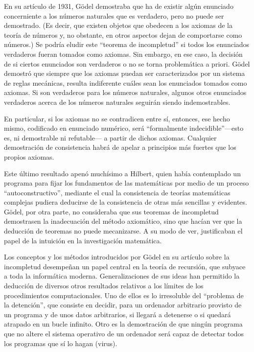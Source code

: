 \documentclass[a4paper, 12pt]{article}
\begin{document}
En su artículo de 1931, Gödel demostraba que ha de existir algún enunciado concerniente a los números naturales que es verdadero, pero no puede ser demostrado. (Es decir, que existen objetos que obedecen a los axiomas de la teoría de números y, no obstante, en otros aspectos dejan de comportarse como números.) Se podría eludir este ``teorema de incompletud'' si todos los enunciados verdaderos fueran tomados como axiomas. Sin embargo, en ese caso, la decisión de si ciertos enunciados son verdaderos o no se torna problemática a priori. Gödel demostró que siempre que los axiomas puedan ser caracterizados por un sistema de reglas mecánicas, resulta indiferente cuáles sean los enunciados tomados como axiomas. Si son verdaderos para los números naturales, algunos otros enunciados verdaderos acerca de los números naturales seguirán siendo indemostrables.

En particular, si los axiomas no se contradicen entre sí, entonces, ese hecho mismo, codificado en enunciado numérico, será ``formalmente indecidible''\linebreak ---esto es, ni demostrable ni refutable--- a partir de dichos axiomas. Cualquier demostración de consistencia habrá de apelar a principios más fuertes que los propios axiomas.

Este último resultado apenó muchísimo a Hilbert, quien había contemplado un programa para fijar los fundamentos de las matemáticas por medio de un proceso ``autoconstructivo'', mediante el cual la consistencia de teorías matemáticas complejas pudiera deducirse de la consistencia de otras más sencillas y evidentes. Gödel, por otra parte, no consideraba que sus teoremas de incompletud demostrasen la inadecuación del método axiomático, sino que hacían ver que la deducción de teoremas no puede mecanizarse. A su modo de ver, justificaban el papel de la intuición en la investigación matemática.

Los conceptos y los métodos introducidos por Gödel en su artículo sobre la incompletud desempeñan un papel central en la teoría de recursión, que subyace a toda la informática moderna. Generalizaciones de sus ideas han permitido la deducción de diversos otros resultados relativos a los límites de los procedimientos computacionales. Uno de ellos es lo irresoluble del ``problema de la detención'', que consiste en decidir, para un ordenador arbitrario provisto de un programa y de unos datos arbitrarios, si llegará a detenerse o si quedará atrapado en un bucle infinito. Otro es la demostración de que ningún programa que no altere el sistema operativo de un ordenador será capaz de detectar todos los programas que sí lo hagan (virus).
\end{document}
